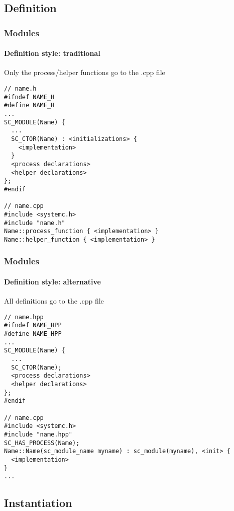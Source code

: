 \subsection{Definition}

\begin{frame}[fragile]
\frametitle{Modules}
\framesubtitle{Definition style: traditional}

\begin{block}{Only the process/helper functions go to the .cpp file}
{\scriptsize
\vspace{-0.5em}
\begin{verbatim}
// name.h
#ifndef NAME_H
#define NAME_H
...
SC_MODULE(Name) {
  ...
  SC_CTOR(Name) : <initializations> {
    <implementation>
  }
  <process declarations>
  <helper declarations>
};
#endif

// name.cpp
#include <systemc.h>
#include "name.h"
Name::process_function { <implementation> }
Name::helper_function { <implementation> }
\end{verbatim}
}
\vspace{-0.5em}
\end{block}
\end{frame}

\begin{frame}[fragile]
\frametitle{Modules}
\framesubtitle{Definition style: alternative}

\begin{block}{All definitions go to the .cpp file}
{\scriptsize
\vspace{-0.5em}
\begin{verbatim}
// name.hpp
#ifndef NAME_HPP
#define NAME_HPP
...
SC_MODULE(Name) {
  ...
  SC_CTOR(Name);
  <process declarations>
  <helper declarations>
};
#endif

// name.cpp
#include <systemc.h>
#include "name.hpp"
SC_HAS_PROCESS(Name);
Name::Name(sc_module_name myname) : sc_module(myname), <init> {
  <implementation>
}
...
\end{verbatim}
}
\vspace{-0.8em}
\end{block}
\end{frame}

\subsection{Instantiation}

